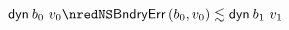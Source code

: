 {\begin{lamportproof*}
\begin{pfproof}
\begin{pfproof}
\begin{pfproof}
              \begin{mathpar}
              \end{mathpar}
            \end{pfproof}
        \end{pfproof}
        \begin{pfproof}
          \qedstep
            \begin{pfproof}
              $\edynb{\sbnd_0}{\svalue_0} \nredNS \rexpr{\boundaryerror{\sbnd_0}{\svalue_0}}{\edynb{\sbnd_1}{\svalue_1}}$
            \end{pfproof}
        \end{pfproof}
    \end{pfproof}


\end{lamportproof*}}
